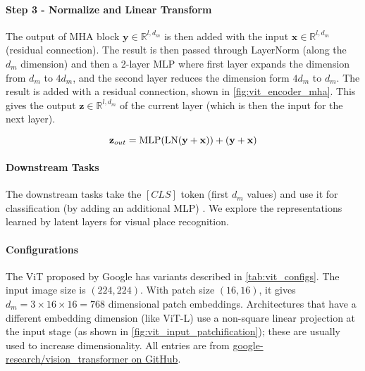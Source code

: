\paragraph{Step 3 - Normalize and Linear Transform}

The output of MHA block $\mathbf{y} \in \mathbb{R}^{l, d_m}$ is then
added with the input $\mathbf{x} \in \mathbb{R}^{l, d_m}$ (residual
connection). The result is then passed through LayerNorm
\cite{Ba2016LayerN} (along the $d_m$ dimension) and then a 2-layer MLP
where first layer expands the dimension from $d_m$ to $4d_m$, and the
second layer reduces the dimension form $4d_m$ to $d_m$. The result is
added with a residual connection, shown in \cref{fig:vit_encoder_mha}.
This gives the output $\mathbf{z} \in \mathbb{R}^{l, d_m}$ of the
current layer (which is then the input for the next layer).

\begin{equation}
    \mathbf{z}_{out} = \mathrm{MLP}(
        \mathrm{LN}(\mathbf{y} + \mathbf{x})) + 
        (\mathbf{y} + \mathbf{x}) \\
\end{equation}

\paragraph{Downstream Tasks}

The downstream tasks take the $\left[CLS\right]$ token (first $d_m$
values) and use it for classification (by adding an additional MLP)
\cite{Dosovitskiy2020AnII}. We explore the representations learned by
latent layers for visual place recognition.

\paragraph{Configurations} The ViT proposed by Google has variants
described in \cref{tab:vit_configs}. The input image size is $(224,
224)$. With patch size $(16, 16)$, it gives $d_m = 3 \times 16 \times
16 = 768$ dimensional patch embeddings. Architectures that have a
different embedding dimension (like ViT-L) use a non-square linear
projection at the input stage (as shown in
\cref{fig:vit_input_patchification}); these are usually used to
increase dimensionality. All entries are from \href{https://github.com/google-research/vision\_transformer/blob/3d8e81478e2f9f34e367ba661ee0cd02cd12ee6b/vit\_jax/configs/models.py}
{google-research/vision\_transformer on GitHub}.

